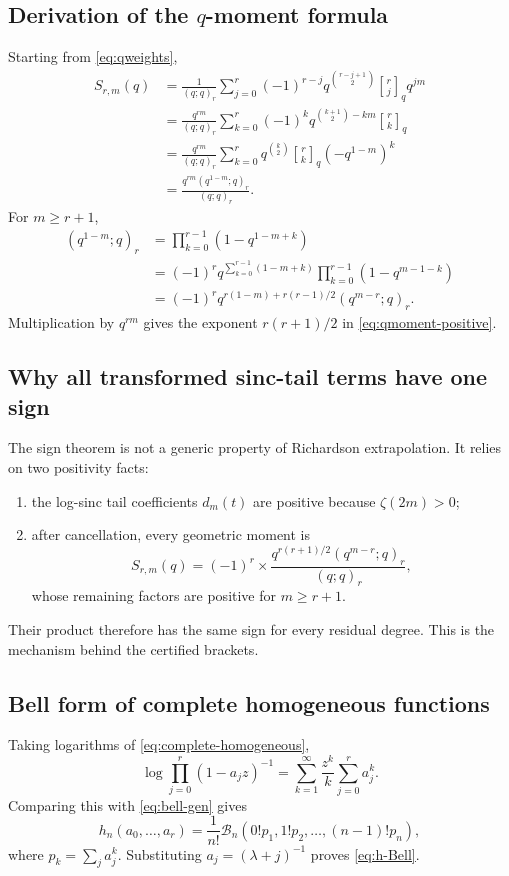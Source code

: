 \documentclass[11pt]{article}
\theoremstyle{definition}
\theoremstyle{remark}
\newcommand{\qbinom}[3]{\genfrac{[}{]}{0pt}{}{#1}{#2}_{#3}}
\begin{document}
\subsection{Derivation of the \texorpdfstring{$q$}{q}-moment formula}

Starting from \cref{eq:qweights},
\begin{align*}
S_{r,m}(q)
&=\frac{1}{(q;q)_r}
\sum_{j=0}^{r}(-1)^{r-j}
q^{\binom{r-j+1}{2}}\qbinom{r}{j}{q} q^{jm}\\
&=\frac{q^{rm}}{(q;q)_r}
\sum_{k=0}^{r}(-1)^k q^{\binom{k+1}{2}-km}\qbinom{r}{k}{q}\\
&=\frac{q^{rm}}{(q;q)_r}
\sum_{k=0}^{r}q^{\binom{k}{2}}\qbinom{r}{k}{q}
(-q^{1-m})^k\\
&=\frac{q^{rm}(q^{1-m};q)_r}{(q;q)_r}.
\end{align*}
For $m\ge r+1$,
\begin{align*}
(q^{1-m};q)_r
&=\prod_{k=0}^{r-1}(1-q^{1-m+k})\\
&=(-1)^r q^{\sum_{k=0}^{r-1}(1-m+k)}
\prod_{k=0}^{r-1}(1-q^{m-1-k})\\
&=(-1)^r q^{r(1-m)+r(r-1)/2}(q^{m-r};q)_r.
\end{align*}
Multiplication by $q^{rm}$ gives the exponent $r(r+1)/2$ in \cref{eq:qmoment-positive}.

\subsection{Why all transformed sinc-tail terms have one sign}

The sign theorem is not a generic property of Richardson extrapolation. It relies on two positivity facts:
\begin{enumerate}
\item the log-sinc tail coefficients $d_m(t)$ are positive because $\zeta(2m)>0$;
\item after cancellation, every geometric moment is
\[
S_{r,m}(q)=(-1)^r\times
\frac{q^{r(r+1)/2}(q^{m-r};q)_r}{(q;q)_r},
\]
whose remaining factors are positive for $m\ge r+1$.
\end{enumerate}
Their product therefore has the same sign for every residual degree. This is the mechanism behind the certified brackets.

\subsection{Bell form of complete homogeneous functions}

Taking logarithms of \cref{eq:complete-homogeneous},
\[
\log\prod_{j=0}^{r}(1-a_jz)^{-1}
=\sum_{k=1}^{\infty}\frac{z^k}{k}\sum_{j=0}^{r}a_j^k.
\]
Comparing this with \cref{eq:bell-gen} gives
\[
h_n(a_0,\ldots,a_r)
=\frac1{n!}\mathcal B_n\left(
0!p_1,1!p_2,\ldots,(n-1)!p_n\right),
\]
where $p_k=\sum_j a_j^k$. Substituting $a_j=(\lambda+j)^{-1}$ proves \cref{eq:h-Bell}.
\end{document}
